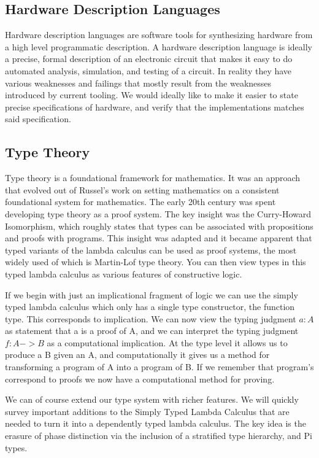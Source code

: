 \documentclass[12pt, titlepage]{article}
\begin{document}
\subsection{Hardware Description Languages}

Hardware description languages are software tools for synthesizing hardware from a high level programmatic description.
A hardware description language is ideally a precise, formal description of an electronic circuit that 
makes it easy to do automated analysis, simulation, and testing of a circuit. In reality they have
various weaknesses and failings that mostly result from the weaknesses introduced by current tooling. 
We would ideally like to make it easier to state precise specifications of hardware, and verify that
the implementations matches said specification.

\subsection{Type Theory}
Type theory is a foundational framework for mathematics. It was an approach that evolved out of Russel's work on setting
mathematics on a consistent foundational system for mathematics. The early 20th century was spent developing type theory
as a proof system. The key insight was the Curry-Howard Isomorphism, which roughly states that types can be associated with
propositions and proofs with programs. This insight was adapted and it became apparent that typed variants of the lambda
calculus can be used as proof systems, the most widely used of which is Martin-Lof type theory. You can then view types in
this typed lambda calculus as various features of constructive logic.

If we begin with just an implicational fragment of logic we can use the simply typed lambda calculus which only has a
single type constructor, the function type. This corresponds to implication. We can now view the typing judgment $a : A$
as statement that a is a proof of A, and we can interpret the typing judgment $f : A -> B$ as a computational implication.
At the type level it allows us to produce a B given an A, and computationally it gives us a method for transforming a program
of A into a program of B. If we remember that program's correspond to proofs we now have a computational method for proving.

We can of course extend our type system with richer features. We will quickly survey important additions to the Simply
Typed Lambda Calculus that are needed to turn it into a dependently typed lambda calculus. The key idea is the erasure
of phase distinction via the inclusion of a stratified type hierarchy, and Pi types.
\end{document}
